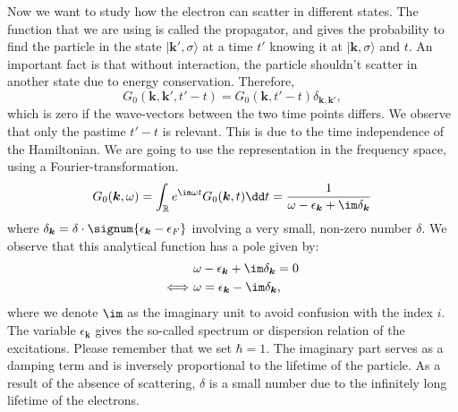 \documentclass[../main.tex]{subfile}
\begin{document}
Now we want to study how the electron can scatter in different states. The function that we are using is called the propagator, and
gives the probability to find the particle in the state $|\bm{k}',\sigma\rangle$ at a time $t'$ knowing it at $|\bm{k},\sigma\rangle$ and $t$. 
An important fact is that without interaction, the particle shouldn't scatter in another state due to energy conservation. Therefore,
\[
    G_0(\bm{k}, \bm{k}', t'-t) = G_0(\bm{k}, t'-t) \delta_{\bm{k}, \bm{k}'},
\]
which is zero if the wave-vectors between the two time points differs. 
We observe that only the pastime $t'-t$ is relevant. This is due to the time independence of the Hamiltonian.
We are going to use the representation in the frequency space, using a Fourier-transformation.
\begin{equation}
    G_0(\bm{k},\omega) = \int_{\mathbb{R}} e^{\im\omega t} G_0(\bm{k},t)\dd t = \frac{1}{\omega - \epsilon_{\bm{k}} + \im \delta_{\bm{k}}} \label{eq:single_propa}
\end{equation}
where $\delta_{\bm{k}} = \delta \cdot\signum{\epsilon_{\bm{k}} - \epsilon_{F}}$ involving a very small, non-zero number $\delta$. We observe that
this analytical function has a pole given by:
\begin{align*}
    &\omega - \epsilon_{\bm{k}} + \im \delta_{\bm{k}} = 0\\
    \Longleftrightarrow ~& \omega = \epsilon_{\bm{k}} - \im \delta_{\bm{k}},
\end{align*}
where we denote $\im$ as the imaginary unit to avoid confusion with the index $i$.
The variable $\epsilon_{\bm{k}}$ gives the so-called spectrum or dispersion relation of the excitations.  Please remember that we set $\hbar =1$. The imaginary part serves as a damping term and is 
inversely proportional to the lifetime of the particle. As a result of the absence of scattering, $\delta$ is a small number due to the infinitely long lifetime of the electrons.\\
\end{document}
